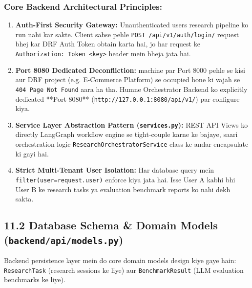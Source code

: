 \documentclass[12pt, a4paper]{article}
\begin{document}
\subsubsection{Core Backend Architectural Principles:}
\begin{enumerate}
    \item \textbf{Auth-First Security Gateway:} Unauthenticated users research pipeline ko run nahi kar sakte. Client sabse pehle \texttt{POST /api/v1/auth/login/} request bhej kar DRF Auth Token obtain karta hai, jo har request ke \texttt{Authorization: Token <key>} header mein bheja jata hai.
    \item \textbf{Port 8080 Dedicated Deconfliction:} machine par Port 8000 pehle se kisi aur DRF project (e.g. E-Commerce Platform) se occupied hone ki vajah se \texttt{404 Page Not Found} aara ha tha. Humne Orchestrator Backend ko explicitly dedicated **Port 8080** (\texttt{http://127.0.0.1:8080/api/v1/}) par configure kiya.
    \item \textbf{Service Layer Abstraction Pattern (\texttt{services.py}):} REST API Views ko directly LangGraph workflow engine se tight-couple karne ke bajaye, saari orchestration logic \texttt{ResearchOrchestratorService} class ke andar encapsulate ki gayi hai.
    \item \textbf{Strict Multi-Tenant User Isolation:} Har database query mein \texttt{filter(user=request.user)} enforce kiya jata hai. Isse User A kabhi bhi User B ke research tasks ya evaluation benchmark reports ko nahi dekh sakta.
\end{enumerate}

\clearpage
\subsection{11.2 Database Schema \& Domain Models (\texttt{backend/api/models.py})}

Backend persistence layer mein do core domain models design kiye gaye hain: \texttt{ResearchTask} (research sessions ke liye) aur \texttt{BenchmarkResult} (LLM evaluation benchmarks ke liye).
\end{document}
